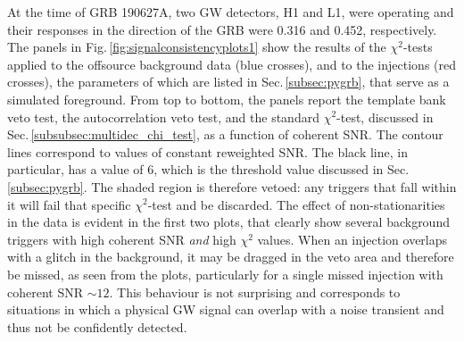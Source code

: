 \documentclass[binding=0.6cm, LaM]{sapthesis}
\begin{document}
	At the time of GRB 190627A, two GW detectors, H1 and L1, 
	were operating and their responses in the direction of the GRB were 0.316 and 0.452, respectively.
	The panels in Fig.\,\ref{fig:signalconsistencyplots1} show the results 
	of the $\chi^2$-tests applied to the offsource background data (blue crosses), and to the injections (red crosses),
	the parameters of which are listed in Sec.\,\ref{subsec:pygrb}, that serve as a simulated foreground. 
	From top to bottom, the panels report the template bank veto test, 
	the autocorrelation veto test, and the standard $\chi^2$-test, 
	discussed in Sec.\,\ref{subsubsec:multidec_chi_test}, as a function of coherent SNR. 
	The contour lines correspond to values of constant reweighted SNR.  
	The black line, in particular, has a value of 6, 
	which is the threshold value discussed in Sec.\,\ref{subsec:pygrb}.
	The shaded region is therefore vetoed: any triggers that fall within it 
	will fail that specific $\chi^2$-test and be discarded.
	The effect of non-stationarities in the data is evident in the first two plots, 
	that clearly show several background triggers with high coherent SNR \emph{and} high $\chi^2$ values.  
	When an injection overlaps with a glitch in the background, 
	it may be dragged in the veto area and therefore be missed, as seen from the plots, 	
	particularly for a single missed injection with coherent SNR $\sim 12$.  
	This behaviour is not surprising and corresponds to situations in which a physical GW signal 
	can overlap with a noise transient and thus not be confidently detected.
\end{document}
